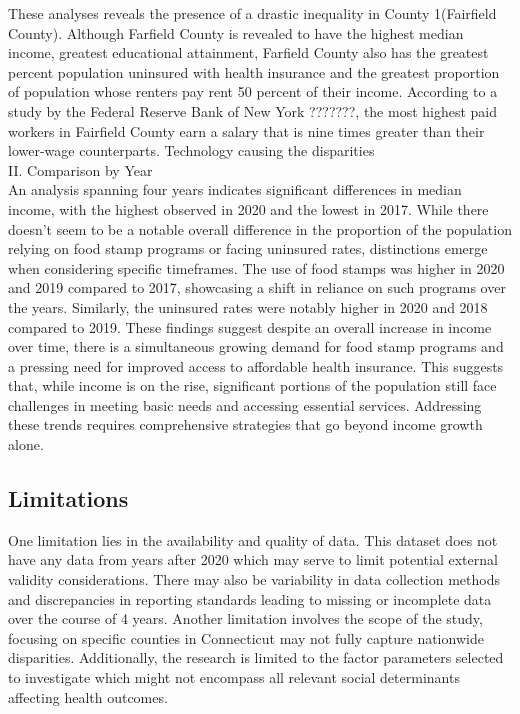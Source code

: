 \documentclass[12pt]{article}
\begin{document}
These analyses reveals the presence of a drastic inequality in County 1(Fairfield County). Although Farfield County
is revealed to have the highest median income, greatest educational attainment, Farfield County also has the greatest 
percent population uninsured with health insurance and the greatest proportion of population whose renters pay rent 
50 percent of their income. According to a study by the Federal Reserve Bank of New York{ ???????}, the most highest paid 
workers in Fairfield County earn a salary that is nine times greater than their lower-wage counterparts. Technology causing the disparities
\\
II. Comparison by Year
\\
An analysis spanning four years indicates significant differences in median income, with the highest observed 
in 2020 and the lowest in 2017. While there doesn't seem to be a notable overall difference in the proportion 
of the population relying on food stamp programs or facing uninsured rates, distinctions emerge when considering 
specific timeframes. The use of food stamps was higher in 2020 and 2019 compared to 2017, showcasing a 
shift in reliance on such programs over the years. Similarly, the uninsured rates were notably higher in 2020 and 
2018 compared to 2019. These findings suggest despite an overall increase in income over time, there is a simultaneous 
growing demand for food stamp programs and a pressing need for improved access to affordable health insurance. 
This suggests that, while income is on the rise, significant portions of the population still face challenges in
 meeting basic needs and accessing essential services. Addressing these trends requires comprehensive strategies 
 that go beyond income growth alone.



\subsection{Limitations}
One limitation lies in the availability and quality of data. This dataset does not have any 
data from years after 2020 which may serve to limit potential external validity considerations. 
There may also be variability in data collection methods and discrepancies in reporting standards 
leading to missing or incomplete data over the course of 4 years. Another limitation involves the scope 
of the study, focusing on specific counties in Connecticut may not fully capture nationwide disparities. 
Additionally, the research is limited to the factor parameters selected to investigate which  might not 
encompass all relevant social determinants affecting health outcomes.
\end{document}
